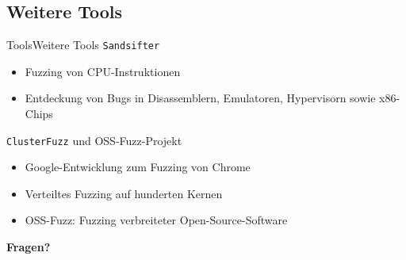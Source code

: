 \documentclass[ngerman,aspectratio=1610,12pt]{beamer}
\begin{document}
\subsection*{Weitere Tools}
\begin{frame}{Tools}{Weitere Tools}
  \texttt{Sandsifter}
  \begin{itemize}
    \item Fuzzing von CPU-Instruktionen
    \item Entdeckung von Bugs in Disassemblern, Emulatoren, Hypervisorn sowie x86-Chips 
  \end{itemize}
  
  
  \texttt{ClusterFuzz} und OSS-Fuzz-Projekt
  \begin{itemize}
    \item Google-Entwicklung zum Fuzzing von Chrome
    \item Verteiltes Fuzzing auf hunderten Kernen
    \item OSS-Fuzz: Fuzzing verbreiteter  Open-Source-Software
  \end{itemize}
\end{frame}

\begin{frame}{}
  \centering \Huge
  \textbf{Fragen?}
\end{frame}
\end{document}
